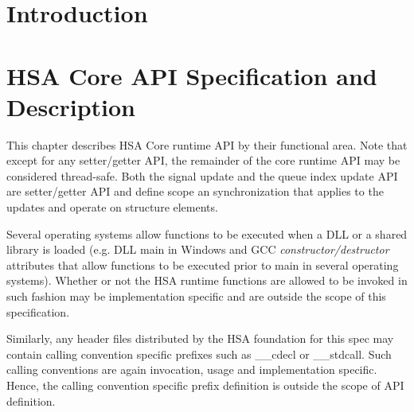 \documentclass{book}
\begin{document}
\hypersetup{pageanchor=true,citecolor=blue}
\chapter{Introduction} \label{index}\hypertarget{index}{}


\chapter{HSA Core A\-P\-I Specification and Description} \label{coreapi}
\hypertarget{coreapi}{}
This chapter describes HSA Core runtime API by their functional
area. Note that except for any setter/getter API, the remainder of
the core runtime API may be considered thread-safe.  Both the signal
update and the queue index update API are setter/getter API and
define scope an synchronization that applies to the updates and
operate on structure elements.

Several operating systems allow functions to be executed when a DLL
or a shared library is loaded (e.g. DLL main in Windows and GCC
\emph{constructor/destructor} attributes that allow functions to be
executed prior to main in several operating systems).
Whether or not the HSA runtime functions are allowed to be invoked
in such fashion may be implementation specific and are outside the
scope of this specification.

Similarly, any header files distributed by the HSA foundation for
this spec may contain calling convention specific prefixes such as
\_\_cdecl or \_\_stdcall. Such calling conventions are again invocation,
usage and implementation specific. Hence, the calling convention
specific prefix definition is outside the scope of API definition.









\end{document}
